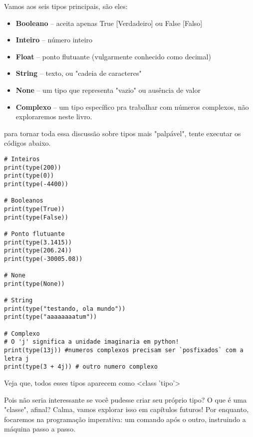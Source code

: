 \documentclass[12pt]{book}
\begin{document}
	Vamos aos seis tipos principais, são eles:
	\begin{tcolorbox}[colback=gray!10, colframe=black, title={\large\bfseries Lista de tipos principais}]
		\begin{itemize}
			\item \textbf{Booleano} -- aceita apenas True [Verdadeiro] ou False [Falso]
			\item \textbf{Inteiro} -- número inteiro
			\item \textbf{Float} -- ponto flutuante (vulgarmente conhecido como decimal)
			\item \textbf{String} -- texto, ou "cadeia de caracteres"
			\item \textbf{None} -- um tipo que representa "vazio" ou ausência de valor
			\item \textbf{Complexo} -- um tipo específico pra trabalhar com números complexos, não exploraremos neste livro.
		\end{itemize}		
	\end{tcolorbox}
	
	
	para tornar toda essa discussão sobre tipos mais "palpável", tente executar os códigos abaixo.
	
	\begin{lstlisting}[caption={Verificando os tipos de variáveis em python}] 
# Inteiros
print(type(200))
print(type(0))
print(type(-4400))

# Booleanos
print(type(True))
print(type(False))

# Ponto flutuante
print(type(3.1415))
print(type(206.24))
print(type(-30005.08))

# None
print(type(None))

# String
print(type("testando, ola mundo"))
print(type("aaaaaaaatum"))

# Complexo
# O 'j' significa a unidade imaginaria em python!
print(type(13j)) #numeros complexos precisam ser `posfixados` com a letra j
print(type(3 + 4j)) # outro numero complexo\end{lstlisting}
	
	Veja que, todos esses tipos aparecem como <class 'tipo'> \newline
	
	Pois não seria interessante se você pudesse criar seu próprio tipo? O que é uma "classe", afinal? \newline
	Calma, vamos explorar isso em capítulos futuros! Por enquanto, focaremos na programação imperativa: um comando após o outro, instruindo a máquina passo a passo.
	
\end{document}
